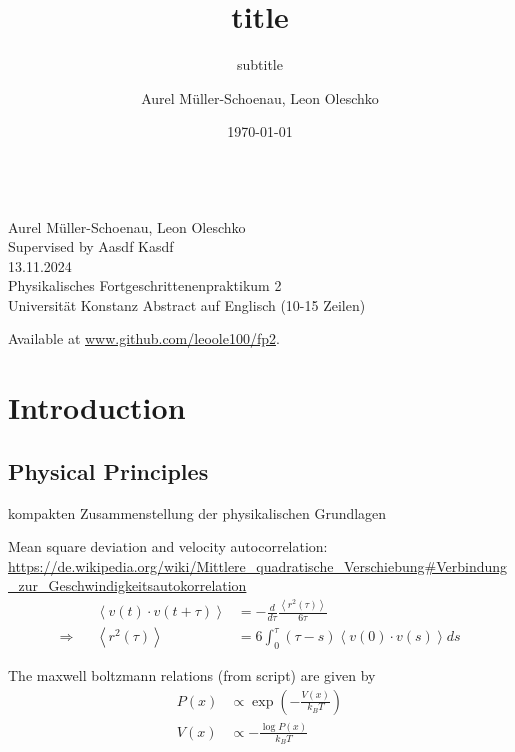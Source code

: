 \documentclass[
    parskip=half, 
    twoside=false,
    twocolumn=true,
    fontsize=11pt,
]{scrarticle}
\begin{document}
\title{title}
\subtitle{subtitle}
\author{Aurel Müller-Schoenau, Leon Oleschko}
\date{\dotdate\today}


\begin{titlepage}
    \sffamily
    \vspace*{3cm}
    {
        \fontsize{32}{32}
    }
    \vspace{.25cm}\\
    {
        \Large
        Aurel Müller-Schoenau, Leon Oleschko\\
        Supervised by Aasdf Kasdf
        \vspace{.05cm}\\
        13.11.2024
        \vspace{.25cm}\\
        \normalsize
        Physikalisches Fortgeschrittenenpraktikum 2\\
        Universität Konstanz
    }
    \vfill
    {
        \normalfont\normalsize
        Abstract auf Englisch (10-15 Zeilen)
        \blindtext[2]
    }
    \vfill
    \begin{flushright}
        Available at \url{www.github.com/leoole100/fp2}.
    \end{flushright}
\end{titlepage}

\section{Introduction}

\subsection{Physical Principles}
kompakten Zusammenstellung der physikalischen Grundlagen

Mean square deviation and velocity autocorrelation:
\url{https://de.wikipedia.org/wiki/Mittlere_quadratische_Verschiebung#Verbindung_zur_Geschwindigkeitsautokorrelation}
\begin{align}
    &&\left<v(t)\cdot v(t+\tau)\right> &= - \frac{d}{d\tau} \frac{\left<r^2(\tau)\right>}{6\tau}\\
    \Rightarrow&&\left<r^2(\tau)\right> &= 6 \int_0^\tau (\tau - s) \left<v(0) \cdot v(s)\right> ds
\end{align}

The maxwell boltzmann relations (from script) are given by
\begin{align}
    P(x) &\propto \exp\left(- \frac{V(x)}{k_B T}\right)\\
    V(x) &\propto - \frac{\log{P(x)}}{k_B T}
\end{align}
\end{document}

